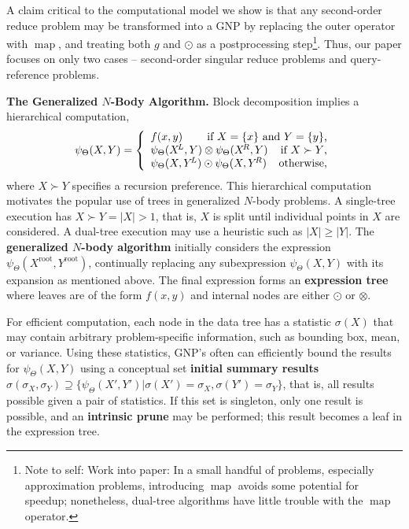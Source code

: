 \documentclass[times, leqno,twocolumn]{article}
\newcommand{\authornote}[1]{\footnote{Note to self: #1}}
\newcommand{\authorsnote}[1]{\authornote{#1}}
\newcommand{\prefsplit}[2]{#1 \succ #2}
\newcommand{\summary}{\hat{\sigma}}
\DeclareMathOperator*{\map}{map}
\newcommand{\gnp}{\psi_{\Theta}}
\newcommand{\defterm}[1]{{\bf #1}}
\newcommand{\kdroot}[1]{#1^{\text{root}}}
\newcommand{\kdleft}[1]{#1^{\!L}}
\newcommand{\kdright}[1]{#1^{\!R}}
\newcommand{\outstat}{\sigma}
\begin{document}
A claim critical to the computational model we show is that any second-order reduce problem may be transformed into a GNP by replacing the outer operator with $\map$, and treating both $g$ and $\odot$ as a postprocessing step\authorsnote{Work into paper: In a small handful of problems, especially approximation problems, introducing $\map$ avoids some potential for speedup; nonetheless, dual-tree algorithms have little trouble with the $\map$ operator.}.
Thus, our paper focuses on only two cases -- second-order singular reduce problems and query-reference problems.

{\bf The Generalized $N$-Body Algorithm.}
Block decomposition implies a hierarchical computation,
\[
\gnp(X,Y) = \left\{ \begin{array}{lrr}
    f(x,y) & \multicolumn{2}{r}{\text{if }X = \{x\}\text{ and }Y = \{y\}\text{,}}
    \\
    \multicolumn{2}{l}{\gnp(\kdleft{X},Y) \otimes \gnp(\kdright{X}, Y)} & \text{if }\prefsplit{X}{Y}\text{,}
    \\
    \multicolumn{2}{l}{\gnp(X,\kdleft{Y}) \odot \gnp(X,\kdright{Y})} & \text{otherwise,}
  \end{array}
\right.
\]
\noindent where $\prefsplit{X}{Y}$ specifies a recursion preference.
This hierarchical computation motivates the popular use of trees in generalized $N$-body problems.
A single-tree execution has $\prefsplit{X}{Y} = |X| > 1$, that is, $X$ is split until individual points in $X$ are considered.
A dual-tree execution may use a heuristic such as $|X| \geq |Y|$.
The \defterm{generalized $N$-body algorithm} initially considers the expression $\gnp(\kdroot{X}, \kdroot{Y})$, continually replacing any subexpression $\gnp(X, Y)$ with its expansion as mentioned above.
The final expression forms an \defterm{expression tree} where leaves are of the form $f(x,y)$ and internal nodes are either $\odot$ or $\otimes$.

For efficient computation, each node in the data tree has a statistic $\outstat(X)$ that may contain arbitrary problem-specific information, such as bounding box, mean, or variance.
Using these statistics, GNP's often can efficiently bound the results for $\gnp(X,Y)$ using a conceptual set \defterm{initial summary results} $\summary(\outstat_X,\outstat_Y) \supseteq \{\gnp(X',Y') | \outstat(X')\!\!=\!\!\outstat_X, \outstat(Y')\!\!=\!\!\outstat_Y\}$, that is, all results possible given a pair of statistics.
If this set is singleton, only one result is possible, and an \defterm{intrinsic prune} may be performed; this result becomes a leaf in the expression tree.
\end{document}
